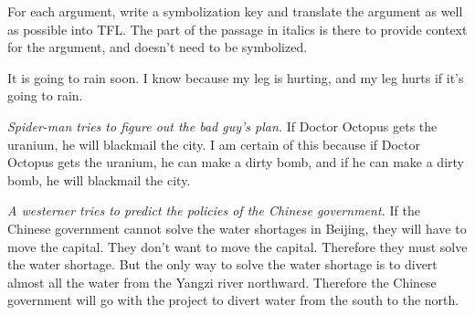 \problempart
For each argument, write a symbolization key and translate the argument as well as possible into TFL. The part of the passage in italics is there to provide context for the argument, and doesn't need to be symbolized.
\begin{earg}
\item It is going to rain soon. I know because my leg is hurting, and my leg hurts if it's going to rain. 



\item  \emph{Spider-man tries to figure out the bad guy's plan.} If Doctor Octopus gets the uranium, he will blackmail the city. I am certain of this because if Doctor Octopus gets the uranium, he can make a dirty bomb, and if he can make a dirty bomb, he will blackmail the city.



\item \emph{A westerner tries to predict the policies of the Chinese government.} If the Chinese government cannot solve the water shortages in Beijing, they will have to move the capital. They don't want to move the capital. Therefore they must solve the water shortage. But the only way to solve the water shortage is to divert almost all the water from the Yangzi river northward. Therefore the Chinese government will go with the project to divert water from the south to the north.       





\end{earg}

